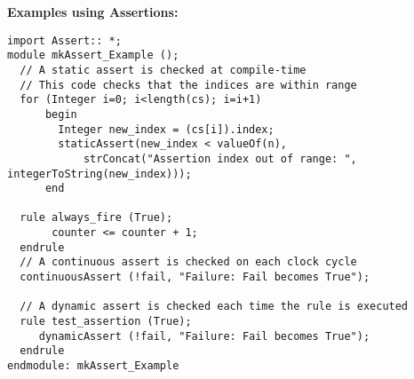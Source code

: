 {\bf Examples using Assertions:}

\begin{verbatim}
import Assert:: *;
module mkAssert_Example ();
  // A static assert is checked at compile-time
  // This code checks that the indices are within range 
  for (Integer i=0; i<length(cs); i=i+1)
      begin 
        Integer new_index = (cs[i]).index;
        staticAssert(new_index < valueOf(n), 
            strConcat("Assertion index out of range: ", integerToString(new_index)));
      end 

  rule always_fire (True);
       counter <= counter + 1;
  endrule
  // A continuous assert is checked on each clock cycle
  continuousAssert (!fail, "Failure: Fail becomes True");

  // A dynamic assert is checked each time the rule is executed
  rule test_assertion (True);
     dynamicAssert (!fail, "Failure: Fail becomes True");
  endrule
endmodule: mkAssert_Example
\end{verbatim}



